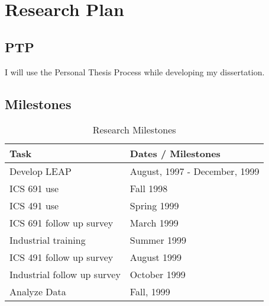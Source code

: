 
\chapter{Research Plan}
\label{sec:plan}

\section{PTP}

I will use the Personal Thesis Process\cite{johnsonPTP} while developing my dissertation.

\section{Milestones}
\begin{table}
  \caption{Research Milestones}
  
  \begin{center}
    \begin{tabular}{|l|l|}\hline
      {\bf Task}&{\bf Dates / Milestones}\\ \hline \hline
      Develop LEAP& August, 1997 - December, 1999\\ \hline
      ICS 691 use& Fall 1998\\ \hline
      ICS 491 use& Spring 1999\\ \hline
      ICS 691 follow up survey& March 1999\\ \hline
      Industrial training& Summer 1999\\ \hline
      ICS 491 follow up survey& August 1999\\ \hline
      Industrial follow up survey& October 1999\\ \hline
      Analyze Data& Fall, 1999\\ \hline
    \end{tabular}
  \end{center}
\end{table}
